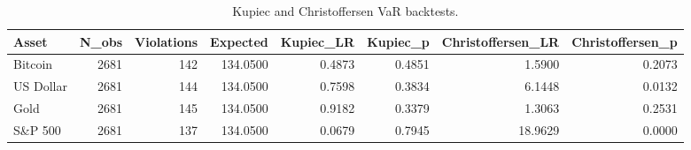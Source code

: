 \begin{table}
\caption{Kupiec and Christoffersen VaR backtests.}
\label{tab:var_backtest}
\begin{tabular}{lrrrrrrr}
\toprule
Asset & N\_obs & Violations & Expected & Kupiec\_LR & Kupiec\_p & Christoffersen\_LR & Christoffersen\_p \\
\midrule
Bitcoin & 2681 & 142 & 134.0500 & 0.4873 & 0.4851 & 1.5900 & 0.2073 \\
US Dollar & 2681 & 144 & 134.0500 & 0.7598 & 0.3834 & 6.1448 & 0.0132 \\
Gold & 2681 & 145 & 134.0500 & 0.9182 & 0.3379 & 1.3063 & 0.2531 \\
S\&P 500 & 2681 & 137 & 134.0500 & 0.0679 & 0.7945 & 18.9629 & 0.0000 \\
\bottomrule
\end{tabular}
\end{table}
